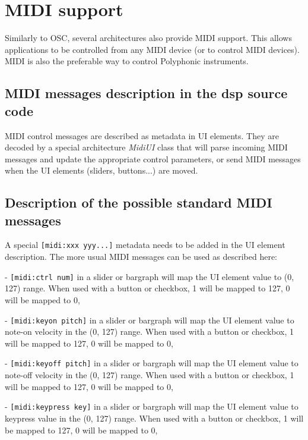 \chapter{MIDI support} \label{sec:midi}

Similarly to OSC, several \faust architectures also provide MIDI support. This allows \faust applications to be controlled from any MIDI device (or to control MIDI devices). MIDI is also the preferable way to control Polyphonic instruments.

\section{MIDI messages description in the dsp source code}

MIDI control messages are described as metadata in UI elements. They are decoded by a special architecture \emph{MidiUI} class that will parse incoming MIDI messages and update the appropriate control parameters, or send MIDI messages when the UI elements (sliders, buttons...) are moved.

\section{Description of the possible standard MIDI messages}

A special \lstinline'[midi:xxx yyy...]' metadata needs to be added in the UI  element description. The more usual MIDI messages can be used as described here:

- \lstinline'[midi:ctrl num]' in a slider or bargraph will map the UI element value to (0, 127) range. When used with a button or checkbox, 1 will be mapped to 127, 0 will be mapped to 0,

- \lstinline'[midi:keyon pitch]' in a slider or bargraph will map the UI element value to note-on velocity in the (0, 127) range. When used with a button or checkbox, 1 will be mapped to 127, 0 will be mapped to 0,

- \lstinline'[midi:keyoff pitch]' in a slider or bargraph will map the UI element value to note-off velocity in the (0, 127) range. When used with a button or checkbox, 1 will be mapped to 127, 0 will be mapped to 0,

- \lstinline'[midi:keypress key]' in a slider or bargraph will map the UI element value to keypress value in the (0, 127) range. When used with a button or checkbox, 1 will be mapped to 127, 0 will be mapped to 0,

